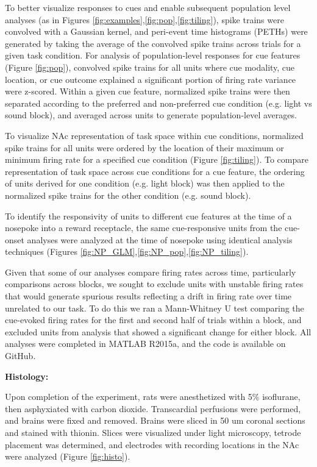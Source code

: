 \documentclass[11pt]{article}
\begin{document}
To better visualize responses to cues and enable subsequent population level analyses (as in Figures \ref{fig:examples},\ref{fig:pop},\ref{fig:tiling}), spike trains were convolved with a Gaussian kernel, and peri-event time histograms (PETHs) were generated by taking the average of the convolved spike trains across trials for a given task condition. For analysis of population-level responses for cue features (Figure \ref{fig:pop}), convolved spike trains for all units where cue modality, cue location, or cue outcome explained a significant portion of firing rate variance were z-scored. Within a given cue feature, normalized spike trains were then separated according to the preferred and non-preferred cue condition (e.g. light vs sound block), and averaged across units to generate population-level averages.

To visualize NAc representation of task space within cue conditions, normalized spike trains for all units were ordered by the location of their maximum or minimum firing rate for a specified cue condition (Figure \ref{fig:tiling}). To compare representation of task space across cue conditions for a cue feature, the ordering of units derived for one condition (e.g. light block) was then applied to the normalized spike trains for the other condition (e.g. sound block). 

To identify the responsivity of units to different cue features at the time of a nosepoke into a reward receptacle, the same cue-responsive units from the cue-onset analyses were analyzed at the time of nosepoke using identical analysis techniques (Figures \ref{fig:NP_GLM},\ref{fig:NP_pop},\ref{fig:NP_tiling}).

Given that some of our analyses compare firing rates across time, particularly comparisons across blocks, we sought to exclude units with unstable firing rates that would generate spurious results reflecting a drift in firing rate over time unrelated to our task. To do this we ran a Mann-Whitney U test comparing the cue-evoked firing rates for the first and second half of trials within a block, and excluded units from analysis that showed a significant change for either block.  All analyses were completed in MATLAB R2015a, and the code is available on GitHub.


{\bf Histology:}

Upon completion of the experiment, rats were anesthetized with 5\% isoflurane, then asphyxiated with carbon dioxide. Transcardial perfusions were performed, and brains were fixed and removed. Brains were sliced in 50 um coronal sections and stained with thionin. Slices were visualized under light microscopy, tetrode placement was determined, and electrodes with recording locations in the NAc were analyzed (Figure \ref{fig:histo}).
\end{document}
